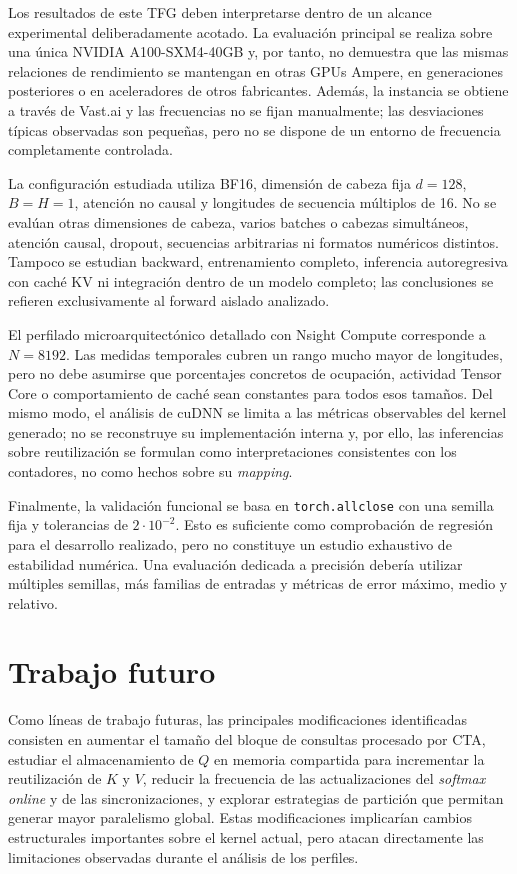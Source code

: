 Los resultados de este TFG deben interpretarse dentro de un alcance experimental deliberadamente acotado. La evaluación principal se realiza sobre una única NVIDIA A100-SXM4-40GB y, por tanto, no demuestra que las mismas relaciones de rendimiento se mantengan en otras GPUs Ampere, en generaciones posteriores o en aceleradores de otros fabricantes. Además, la instancia se obtiene a través de Vast.ai y las frecuencias no se fijan manualmente; las desviaciones típicas observadas son pequeñas, pero no se dispone de un entorno de frecuencia completamente controlada.

La configuración estudiada utiliza BF16, dimensión de cabeza fija \(d=128\), \(B=H=1\), atención no causal y longitudes de secuencia múltiplos de 16. No se evalúan otras dimensiones de cabeza, varios batches o cabezas simultáneos, atención causal, dropout, secuencias arbitrarias ni formatos numéricos distintos. Tampoco se estudian backward, entrenamiento completo, inferencia autoregresiva con caché KV ni integración dentro de un modelo completo; las conclusiones se refieren exclusivamente al forward aislado analizado.

El perfilado microarquitectónico detallado con Nsight Compute corresponde a \(N=8192\). Las medidas temporales cubren un rango mucho mayor de longitudes, pero no debe asumirse que porcentajes concretos de ocupación, actividad Tensor Core o comportamiento de caché sean constantes para todos esos tamaños. Del mismo modo, el análisis de cuDNN se limita a las métricas observables del kernel generado; no se reconstruye su implementación interna y, por ello, las inferencias sobre reutilización se formulan como interpretaciones consistentes con los contadores, no como hechos sobre su \textit{mapping}.

Finalmente, la validación funcional se basa en \texttt{torch.allclose} con una semilla fija y tolerancias de \(2\cdot10^{-2}\). Esto es suficiente como comprobación de regresión para el desarrollo realizado, pero no constituye un estudio exhaustivo de estabilidad numérica. Una evaluación dedicada a precisión debería utilizar múltiples semillas, más familias de entradas y métricas de error máximo, medio y relativo.

\section{Trabajo futuro}

Como líneas de trabajo futuras, las principales modificaciones identificadas consisten en aumentar el tamaño del bloque de consultas procesado por CTA, estudiar el almacenamiento de \(Q\) en memoria compartida para incrementar la reutilización de \(K\) y \(V\), reducir la frecuencia de las actualizaciones del \textit{softmax online} y de las sincronizaciones, y explorar estrategias de partición que permitan generar mayor paralelismo global. Estas modificaciones implicarían cambios estructurales importantes sobre el kernel actual, pero atacan directamente las limitaciones observadas durante el análisis de los perfiles.

